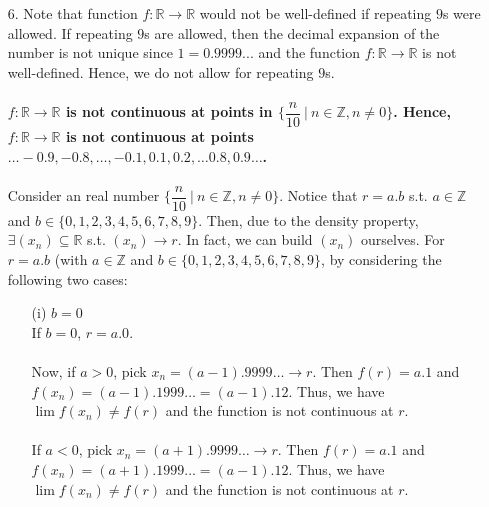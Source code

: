 \documentclass[11pt]{article}
\DeclarePairedDelimiter\abs{\lvert}{\rvert}%
\newcommand{\reals}{\mathbb{R}}
\newcommand{\ints}{\mathbb{Z}}
\begin{document}
\begin{itemize}
        Thus, we have now shown that $\forall c \in [0, \infty)$ and
        $\forall \epsilon > 0, \exists \delta > 0$ s.t. whenever
        $\abs{x - c} < \delta$ (with $x \in [0, \infty)$), it follows that
        $\abs{\sqrt[4]{x} - \sqrt[4]{c}} < \epsilon$.\\
        $\qed$

    \newpage

    \item[6.]
        Note that function $f : \reals \to \reals$ would not be well-defined if
        repeating $9$s were allowed. If repeating $9$s are allowed, then the
        decimal expansion of the number is not unique since $1 = 0.9999...$ and
        the function $f : \reals \to \reals$ is not well-defined. Hence, we do
        not allow for repeating $9$s.
        \\
        \\
        \textbf{$f : \reals \to \reals$ is not continuous at points in
        $\Big\{\dfrac{n}{10} \ \big| \ n \in \ints, n \neq 0 \Big\}$. Hence, $f
        : \reals \to \reals$ is not continuous at points $\dots -0.9, -0.8,
        \dots, -0.1, 0.1, 0.2, \dots 0.8, 0.9 \dots$.}
        \\
        \\
        Consider an real number $\Big\{\dfrac{n}{10} \ \big| \ n \in \ints, n
        \neq 0 \Big\}$. Notice that $r = a.b$ s.t. $a \in \ints$ and $b \in
        \{0, 1, 2, 3, 4, 5, 6, 7, 8, 9\}$. Then, due to the density property,
        $\exists (x_n) \subseteq \reals$ s.t. $(x_n) \to r$. In fact, we can
        build $(x_n)$ ourselves. For $r = a.b$ (with $a \in \ints$ and $b \in
        \{0, 1, 2, 3, 4, 5, 6, 7, 8, 9\}$, by considering the following two
        cases:
        \begin{itemize}
            \item[(i)]
                $b = 0$
                \\
                If $b = 0$, $r = a.0$.
                \\
                \\
                Now, if $a > 0$, pick $x_n = (a - 1).9999\dots \to r$. Then
                $f(r) = a.1$ and $f(x_n) = (a - 1).1999\dots = (a - 1).12$.
                Thus, we have $\lim{f(x_n)} \neq f(r)$ and the function is not
                continuous at $r$.
                \\
                \\
                If $a < 0$, pick $x_n = (a + 1).9999\dots \to r$. Then $f(r) =
                a.1$ and $f(x_n) = (a + 1).1999\dots = (a - 1).12$. Thus, we
                have $\lim{f(x_n)} \neq f(r)$ and the function is not
                continuous at $r$.


\end{itemize}
\end{itemize}
\end{document}
